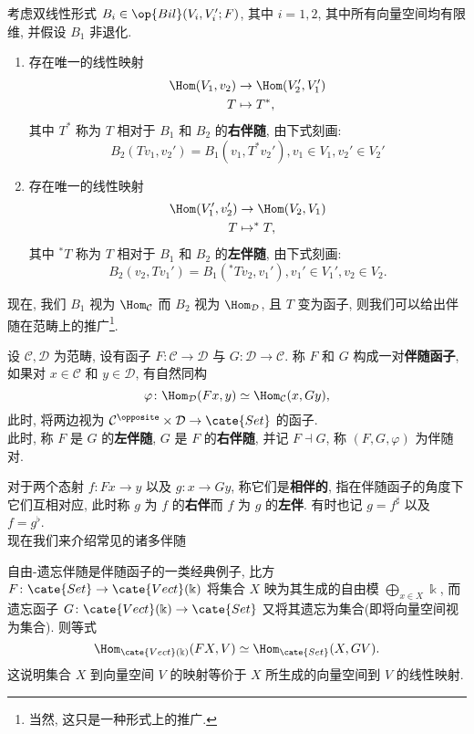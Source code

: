 \begin{definition}[线性映射的伴随映射]
    考虑双线性形式 $B_i \in \op{Bil}(V_i,V_i';F)$, 其中 $i = 1,2$, 其中所有向量空间均有限维, 并假设 $B_1$ 非退化.
    \begin{enumerate}
        \item 存在唯一的线性映射
        \begin{align*}
            \Hom(V_1,v_2) &\to \Hom(V_2',V_1')\\
            T &\mapsto T^*,
        \end{align*}
        其中 $T^*$ 称为 $T$ 相对于 $B_1$ 和 $B_2$ 的\textbf{右伴随}, 由下式刻画:
        \[
        B_2(Tv_1,v_2') = B_1(v_1,T^* v_2'), v_1 \in V_1, v_2' \in V_2'
        \]
        \item 存在唯一的线性映射
        \begin{align*}
            \Hom(V_1',v_2') &\to \Hom(V_2,V_1)\\
            T &\mapsto ^*T,
        \end{align*}
        其中 $^* T$ 称为 $T$ 相对于 $B_1$ 和 $B_2$ 的\textbf{左伴随}, 由下式刻画:
        \[
        B_2(v_2,Tv_1') = B_1(^*Tv_2,v_1'), v_1'\in V_1', v_2 \in V_2.
        \]
    \end{enumerate}
\end{definition}
现在, 我们 $B_1$ 视为 $\Hom_{\cal{C}}$ 而 $B_2$ 视为 $\Hom_{\cal{D}}$, 且 $T$ 变为函子, 则我们可以给出伴随在范畴上的推广\footnote{当然, 这只是一种形式上的推广.}.
\begin{definition}[伴随函子]
    设 $\mathcal{C},\mathcal{D}$ 为范畴, 设有函子 $F \colon \mathcal{C} \to \mathcal{D}$ 与 $G \colon \mathcal{D} \to \mathcal{C}$. 称 $F$ 和 $G$ 构成一对\textbf{伴随函子}, 如果对 $x\in \mathcal{C}$ 和 $y \in \mathcal{D}$, 有自然同构
    \[
    \varphi \colon \Hom_{\mathcal{D}}(Fx,y) \simeq \Hom_{\mathcal{C}}(x,Gy),
    \]
    此时, 将两边视为 $\mathcal{C}^{\opposite} \times \mathcal{D} \to \cate{Set}$ 的函子.\\
    此时, 称 $F$ 是 $G$ 的\textbf{左伴随}, $G$ 是 $F$ 的\textbf{右伴随}, 并记 $F\dashv G$, 称 $(F,G,\varphi)$ 为伴随对.
\end{definition}
对于两个态射 $f \colon Fx \to y$ 以及 $g \colon x \to Gy$, 称它们是\textbf{相伴的}, 指在伴随函子的角度下它们互相对应, 此时称 $g$ 为 $f$ 的\textbf{右伴}而 $f$ 为 $g$ 的\textbf{左伴}. 有时也记 $g = f^{\sharp}$ 以及 $f = g^{\flat}$.\\
现在我们来介绍常见的诸多伴随
\begin{example}[自由-遗忘伴随]
    自由-遗忘伴随是伴随函子的一类经典例子, 比方 $F \colon \cate{Set} \to \cate{Vect}(\Bbbk)$ 将集合 $X$ 映为其生成的自由模 $\bigoplus_{x\in X}\Bbbk$, 而遗忘函子 $G \colon \cate{Vect}(\Bbbk) \to \cate{Set}$ 又将其遗忘为集合(即将向量空间视为集合). 则等式
    \[
    \Hom_{\cate{Vect}(\Bbbk)}(FX,V) \simeq \Hom_{\cate{Set}}(X,GV).
    \]
    这说明集合 $X$ 到向量空间 $V$ 的映射等价于 $X$ 所生成的向量空间到 $V$ 的线性映射.
\end{example}
